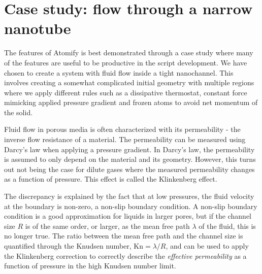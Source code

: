\documentclass[aps,pre,twocolumn,letterpaper,floatfix,nofootinbib]{revtex4}
\begin{document}
\section{\label{sec:casestudy}Case study: flow through a narrow nanotube}
The features of Atomify is best demonstrated through a case study where many of the features are useful to be productive in the script development.
We have chosen to create a system with fluid flow inside a tight nanochannel.
This involves creating a somewhat complicated initial geometry with multiple regions where we apply different rules such as a dissipative thermostat, constant force mimicking applied pressure gradient and frozen atoms to avoid net momentum of the solid.

Fluid flow in porous media is often characterized with its permeability - the inverse flow resistance of a material.
The permeability can be measured using Darcy's law when applying a pressure gradient.
In Darcy's law, the permeability is assumed to only depend on the material and its geometry.
However, this turns out not being the case for dilute
gases where the measured permeability changes as a function of pressure\citep{klinkenberg1941permeability}.
This effect is called the Klinkenberg effect.

The discrepancy is explained by the fact that at low pressures, the fluid velocity
at the boundary is non-zero, a non-slip boundary condition.
A non-slip boundary condition is a good approximation for liquids in larger pores,
but if the channel size $R$ is of the same order,
or larger, as the mean free path $\lambda$ of the fluid, this is no longer true.
The ratio between the mean free path and the channel size is quantified through
the Knudsen number, $\text{Kn} = \lambda / R$, and can be used to apply the Klinkenberg correction\citep{klinkenberg1941permeability}
to correctly describe the \textit{effective permeability} as a function of pressure in the high Knudsen number limit.
\end{document}
